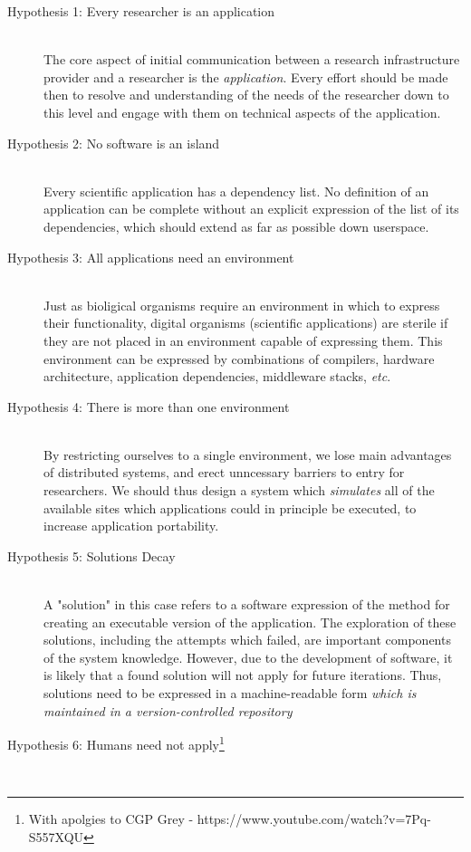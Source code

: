 \documentclass[a4paper]{jpconf}
\begin{document}
\begin{description}
  \item[Hypothesis 1: Every researcher is an application] \hfill \\
    The core aspect of initial communication between a research infrastructure provider and a researcher is the {\it application}. Every effort should be made then to resolve and understanding of the needs of the researcher down to this level and engage with them on technical aspects of the application.
  \item[Hypothesis 2: No software is an island] \hfill \\
    Every scientific application has a dependency list. No definition of an application can be complete without an explicit expression of the list of its dependencies, which should extend as far as possible down userspace.
  \item[Hypothesis 3: All applications need an environment] \hfill \\
    Just as bioligical organisms require an environment in which to express their functionality, digital organisms (scientific applications) are sterile if they are not placed in an environment capable of expressing them. This environment can be expressed by combinations of compilers, hardware architecture, application dependencies, middleware stacks, {\it etc}.
  \item[Hypothesis 4: There is more than one environment] \hfill \\
    By restricting ourselves to a single environment, we lose main advantages of distributed systems, and erect unncessary barriers to entry for researchers. We should thus design a system which {\it simulates} all of the available sites which applications could in principle be executed, to increase application portability.
  \item[Hypothesis 5: Solutions Decay] \hfill \\
    A "solution" in this case refers to a software expression of the method for creating an executable version of the application. The exploration of these solutions, including the attempts which failed, are important components of the system knowledge. However, due to the development of software, it is likely that a found solution will not apply for future iterations. Thus, solutions need to be expressed in a machine-readable form {\it which is maintained in a version-controlled repository}
  \item[Hypothesis 6: Humans need not apply\footnote{With apolgies to CGP Grey - https://www.youtube.com/watch?v=7Pq-S557XQU}] \hfill \\

\end{description}
\end{document}
